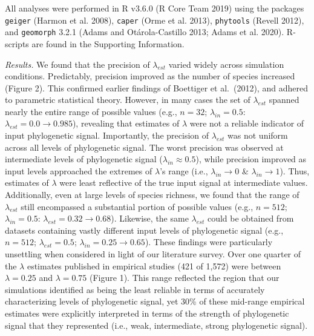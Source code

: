 \documentclass[
]{article}
\begin{document}
All analyses were performed in R v3.6.0 (R Core Team 2019) using the
packages \texttt{geiger} (Harmon et al. 2008), \texttt{caper} (Orme et
al. 2013), \texttt{phytools} (Revell 2012), and \texttt{geomorph} 3.2.1
(Adams and Otárola-Castillo 2013; Adams et al. 2020). R-scripts are
found in the Supporting Information. \hfill\break

\emph{Results.} We found that the precision of \(\lambda_{est}\) varied
widely across simulation conditions. Predictably, precision improved as
the number of species increased (Figure 2). This confirmed earlier
findings of Boettiger et al.~(2012), and adhered to parametric
statistical theory. However, in many cases the set of \(\lambda_{est}\)
spanned nearly the entire range of possible values (e.g., \(n=32\);
\(\lambda_{in}=0.5\): \(\lambda_{est}= 0.0\to 0.985\)), revealing that
estimates of \(\lambda\) were not a reliable indicator of input
phylogenetic signal. Importantly, the precision of \(\lambda_{est}\) was
not uniform across all levels of phylogenetic signal. The worst
precision was observed at intermediate levels of phylogenetic signal
(\(\lambda_{in}\approx0.5\)), while precision improved as input levels
approached the extremes of \(\lambda\)'s range (i.e.,
\(\lambda_{in}\rightarrow0\) \& \(\lambda_{in}\rightarrow1\)). Thus,
estimates of \(\lambda\) were least reflective of the true input signal
at intermediate values. Additionally, even at large levels of species
richness, we found that the range of \(\lambda_{est}\) still encompassed
a substantial portion of possible values (e.g., \(n=512\);
\(\lambda_{in}=0.5\): \(\lambda_{est} = 0.32\to 0.68\)). Likewise, the
same \(\lambda_{est}\) could be obtained from datasets containing vastly
different input levels of phylogenetic signal (e.g., \(n=512\);
\(\lambda_{est} = 0.5\); \(\lambda_{in} = 0.25 \to 0.65\)). These
findings were particularly unsettling when considered in light of our
literature survey. Over one quarter of the \(\lambda\) estimates
published in empirical studies (421 of 1,572) were between
\(\lambda=0.25\) and \(\lambda=0.75\) (Figure 1). This range reflected
the region that our simulations identified as being the least reliable
in terms of accurately characterizing levels of phylogenetic signal, yet
30\% of these mid-range empirical estimates were explicitly interpreted
in terms of the strength of phylogenetic signal that they represented
(i.e., weak, intermediate, strong phylogenetic signal). \hfill\break
\end{document}
